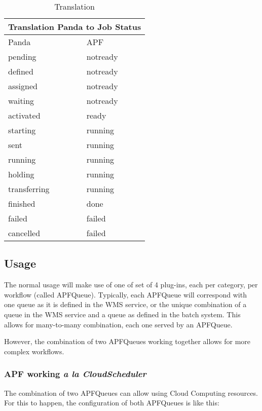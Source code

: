 \documentclass[a4paper]{jpconf}
\begin{document}
\begin{table}
\begin{tabular}{|l|l|}
\hline
\hline
\multicolumn{2}{|c|}{Translation Panda to Job Status} \\
\hline
\hline
Panda         & APF       \\ \hline 
\hline
\hline
pending       & notready  \\ \hline
defined       & notready  \\ \hline
assigned      & notready  \\ \hline
waiting       & notready  \\ \hline
activated     & ready     \\ \hline
starting      & running   \\ \hline
sent          & running   \\ \hline
running       & running   \\ \hline
holding       & running   \\ \hline
transferring  & running   \\ \hline
finished      & done      \\ \hline
failed        & failed    \\ \hline
cancelled     & failed    \\ \hline
\end{tabular}\caption{Translation}
\label{translation}
\end{table}


\subsection{Usage}

The normal usage will make use of one of set of 4 plug-ins, each per category, per workflow (called APFQueue). 
Typically, each APFQueue will correspond with one queue as it is defined in the WMS service, 
or the unique combination of a queue in the WMS service and a queue as defined in the batch system. 
This allows for many-to-many combination, each one served by an APFQueue. 

However, the combination of two APFQueues working together allows for more complex workflows.

\subsubsection{APF working \emph{a la CloudScheduler}}

The combination of two APFQueues can allow using Cloud Computing resources. 
For this to happen, the configuration of both APFQueues is like this:
\end{document}
